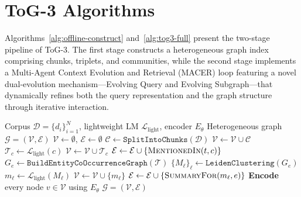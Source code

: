 \section{ToG-3 Algorithms}
\label{appendix:algs}

Algorithms~\ref{alg:offline-construct} and~\ref{alg:tog3-full} present the two-stage pipeline of ToG-3. The first stage constructs a heterogeneous graph index comprising chunks, triplets, and communities, while the second stage implements a Multi-Agent Context Evolution and Retrieval (MACER) loop featuring a novel dual-evolution mechanism—Evolving Query and Evolving Subgraph—that dynamically refines both the query representation and the graph structure through iterative interaction.

\begin{algorithm}[t]
\caption{Offline Construction of Heterogeneous Index Graph $\mathcal{G}$}
\label{alg:offline-construct}
\begin{algorithmic}[1]
\Require Corpus $\mathcal{D}=\{d_i\}_{i=1}^N$, lightweight LM $\mathcal{L}_{\text{light}}$, encoder $E_\theta$
\Ensure Heterogeneous graph $\mathcal{G}=(\mathcal{V},\mathcal{E})$
\State $\mathcal{V} \gets \emptyset$, $\mathcal{E} \gets \emptyset$
\State $\mathcal{C} \gets \texttt{SplitIntoChunks}(\mathcal{D})$ 
\State $\mathcal{V} \gets \mathcal{V} \cup \mathcal{C}$
    \State $\mathcal{T}_c \gets \mathcal{L}_{\text{light}}(c)$  \label{line:extract}
    \State $\mathcal{V} \gets \mathcal{V} \cup \mathcal{T}_c$
        \State $\mathcal{E} \gets \mathcal{E} \cup \{\textsc{MentionedIn}(t, c)\}$
    \EndFor
\EndFor
\State $G_e \gets \texttt{BuildEntityCoOccurrenceGraph}(\mathcal{T})$ 
\State $\{M_\ell\}_\ell \gets \texttt{LeidenClustering}(G_e)$
    \State $m_\ell \gets \mathcal{L}_{\text{light}}(M_\ell)$ 
    \State $\mathcal{V} \gets \mathcal{V} \cup \{m_\ell\}$
        \State $\mathcal{E} \gets \mathcal{E} \cup \{\textsc{SummaryFor}(m_\ell, e)\}$
    \EndFor
\EndFor
\State \textbf{Encode} every node $v \in \mathcal{V}$ using $E_\theta$ 
\State \Return $\mathcal{G}=(\mathcal{V},\mathcal{E})$
\end{algorithmic}
\end{algorithm}

